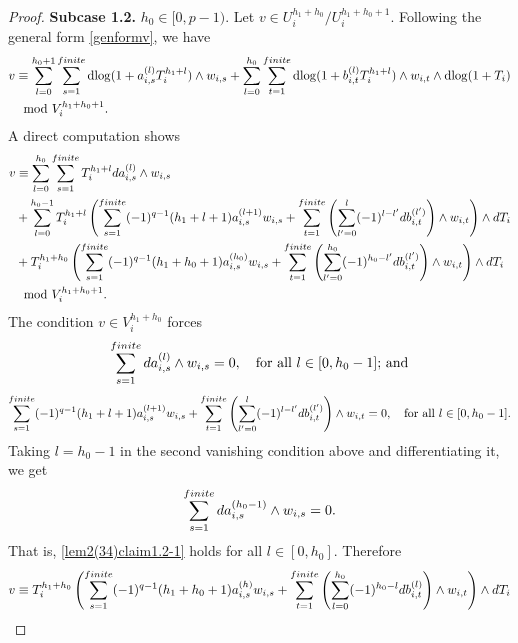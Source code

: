 \documentclass[11pt]{amsart}
\newcommand{\eq}[2]{\begin{equation}\label{#1}#2 \end{equation}}
\newcommand{\dlog}{\operatorname{dlog}}
\theoremstyle{plain}
\theoremstyle{definition}
\numberwithin{equation}{prop}
\begin{document}
\begin{proof}
\textbf{Subcase 1.2.} $h_0\in [0,p-1).$
Let $v\in U^{h_1+h_0}_i/U_i^{h_1+h_0+1}$.
Following the general form \eqref{genformv},  we have
\begin{align*}
v
&\equiv 
\sum_{l=0}^{h_0+1}\sum_{s=1}^{\rm finite}
\dlog(1+a^{(l)}_{i,s}T_i^{h_1+l})\wedge w_{i,s}
+\sum_{l=0}^{h_0}\sum_{t=1}^{\rm finite}
\dlog(1+b^{(l)}_{i,t}T_i^{h_1+l})\wedge w_{i,t}\wedge \dlog (1+T_i)
\\
&\mod V_i^{h_1+h_0+1}.
\end{align*}
A direct computation shows
\begin{align*}
v&\equiv 
\sum_{l=0}^{h_0}\sum_{s=1}^{\rm finite}
T_i^{h_1+l}da_{i,s}^{(l)}\wedge w_{i,s}
\\&+
\sum_{l=0}^{h_0-1}
T_i^{h_1+l}
\left(
\sum_{s=1}^{\rm finite} 
(-1)^{q-1} (h_1+l+1)
a_{i,s}^{(l+1)} w_{i,s}
+
\sum_{t=1}^{\rm finite}
\left(\sum_{l'=0}^{l} (-1)^{l-l'} db_{i,t}^{(l')}\right)
\wedge  w_{i,t}
\right)
\wedge dT_i
\\
&+
T_i^{h_1+h_0}
\left(
\sum_{s=1}^{\rm finite} 
(-1)^{q-1} (h_1+h_0+1)
a_{i,s}^{(h_0)} w_{i,s}
+
\sum_{t=1}^{\rm finite}
\left(\sum_{l'=0}^{h_0} (-1)^{h_0-l'} db_{i,t}^{(l')}\right)
\wedge  w_{i,t}
\right)
\wedge dT_i
\\
&
\mod V_i^{h_1+h_0+1}.
\end{align*}
The condition $v\in V_i^{h_1+h_0}$ forces
\eq{lem2(34)claim1.2-1}{\sum_{s=1}^{\rm finite}da_{i,s}^{(l)}\wedge w_{i,s}=0,
\quad
\text{for all $l\in [0,h_0-1]$; and}}
\eq{lem2(34)claim1.2-2}{\sum_{s=1}^{\rm finite} (-1)^{q-1} (h_1+l+1) a_{i,s}^{(l+1)} w_{i,s}
+
\sum_{t=1}^{\rm finite}
\left(\sum_{l'=0}^{l} (-1)^{l-l'} db_{i,t}^{(l')}\right)
\wedge  w_{i,t}
=0,
\quad
\text{for all $l\in [0,h_0-1]$.}}
Taking $l=h_0-1$ in the second vanishing condition above and differentiating it, we get
$$\sum_{s=1}^{\rm finite}
da_{i,s}^{(h_0-1)}\wedge w_{i,s}=0.$$
That is, \eqref{lem2(34)claim1.2-1} holds for all $l\in [0,h_0]$.
Therefore
\begin{align*}
v&\equiv 
T_i^{h_1+h_0}
\left(
\sum_{s=1}^{\rm finite} 
(-1)^{q-1} (h_1+h_0+1) a_{i,s}^{(h)} w_{i,s}
+
\sum_{t=1}^{\rm finite}
\left(\sum_{l=0}^{h_0} (-1)^{h_0-l} db_{i,t}^{(l)}\right)
\wedge  w_{i,t}
\right)
\wedge dT_i
\\

\end{align*}
\end{proof}
\end{document}
